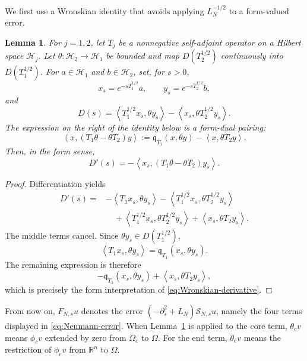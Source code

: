 \documentclass[12pt]{amsart}
\newcommand{\ip}[2]{\left\langle #1,#2\right\rangle}
\newtheorem{lemma}[theorem]{Lemma}
\theoremstyle{remark}
\begin{document}
We first use a Wronskian identity that avoids applying $L_N^{-1/2}$ to a
form-valued error.

\begin{lemma}\label{lem:Wronskian}
For $j=1,2$, let $T_j$ be a nonnegative self-adjoint operator on a Hilbert
space $\mathcal H_j$.  Let $\theta:\mathcal H_2\to\mathcal H_1$ be bounded
and map $D(T_2^{1/2})$ continuously into $D(T_1^{1/2})$.  For
$a\in\mathcal H_1$ and $b\in\mathcal H_2$, set, for $s>0$,
\[
 x_s=e^{-sT_1^{1/2}}a,
 \qquad y_s=e^{-sT_2^{1/2}}b,
\]
and
\[
 D(s)=\ip{T_1^{1/2}x_s}{\theta y_s}
      -\ip{x_s}{\theta T_2^{1/2}y_s}.
\]
The expression on the right of the identity below is a form-dual pairing:
\[
 \ip{x}{(T_1\theta-\theta T_2)y}
 :=\mathfrak q_{T_1}(x,\theta y)-\ip{x}{\theta T_2y}.
\]
Then, in the form sense,
\begin{equation}\label{eq:Wronskian-derivative}
 D'(s)=-\ip{x_s}{(T_1\theta-\theta T_2)y_s}.
\end{equation}
\end{lemma}

\begin{proof}


Differentiation yields
\begin{align*}
 D'(s)
 ={}&-\ip{T_1x_s}{\theta y_s}
     -\ip{T_1^{1/2}x_s}{\theta T_2^{1/2}y_s}\\
 &\quad+\ip{T_1^{1/2}x_s}{\theta T_2^{1/2}y_s}
     +\ip{x_s}{\theta T_2y_s}.
\end{align*}
The middle terms cancel.  Since $\theta y_s\in D(T_1^{1/2})$,
\[
 \ip{T_1x_s}{\theta y_s}
 =\mathfrak q_{T_1}(x_s,\theta y_s).
\]
The remaining expression is therefore
\[
 -\mathfrak q_{T_1}(x_s,\theta y_s)
 +\ip{x_s}{\theta T_2y_s},
\]
which is precisely the form interpretation of
\eqref{eq:Wronskian-derivative}. 

\end{proof}

From now on, $F_{N,s}u$ denotes the error
$(-\partial_s^2+L_N)\mathcal S_{N,s}u$, namely the four terms displayed in
\eqref{eq:Neumann-error}.
When Lemma~\ref{lem:Wronskian} is applied to the core term,
\(\theta_cv\) means \(\phi_cv\) extended by zero from \(\Omega_c\) to
\(\Omega\).  For the end term, \(\theta_ev\) means the restriction of
\(\phi_ev\) from \(\mathbb R^n\) to \(\Omega\).  
\end{document}
